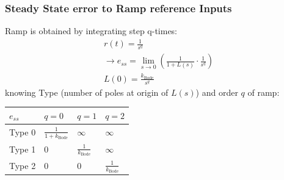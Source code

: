     \subsubsection{Steady State error to Ramp reference Inputs}
        Ramp is obtained by integrating step q-times:
        \begin{align*}
            r(t) = \frac{1}{s^q}\\
            \rightarrow e_{ss} = \lim\limits_{s \rightarrow 0} \left( \frac{1}{1 + L(s)} \cdot \frac{1}{s^q} \right)\\
            L(0) = \frac{k_{\text{Bode}}}{s^q}
        \end{align*}
        knowing Type (number of poles at origin of $L(s)$) and order $q$ of ramp:\\
        \begin{tabu}[width = \linewidth]{| X | X | X | X |}
            \hline
            $e_{ss}$    & $q = 0$                           & $q = 1$                       & $q = 2$\\
            \hline \hline
            Type 0      & $\frac{1}{1 + k_{\text{Bode}}}$   & $\infty$                      & $\infty$\\
            \hline
            Type 1      & $0$                               & $\frac{1}{k_{\text{Bode}}}$   & $\infty$\\
            \hline
            Type 2      & $0$                               & $0$                           & $\frac{1}{k_{\text{Bode}}}$
        \end{tabu}